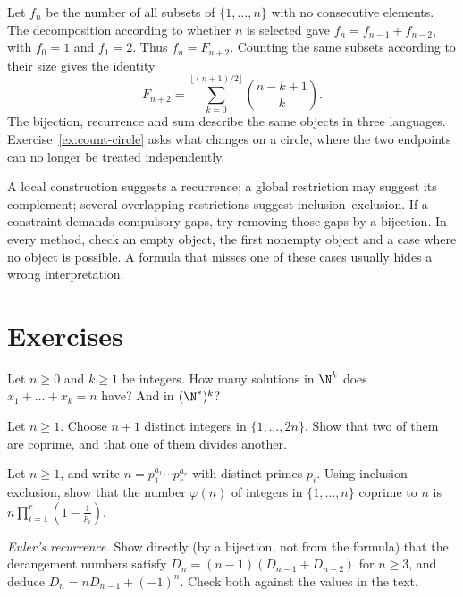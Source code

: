 Let $f_n$ be the number of all subsets of $\{1,\dots,n\}$ with no consecutive elements. The decomposition according to whether $n$ is selected gave $f_n=f_{n-1}+f_{n-2}$, with $f_0=1$ and $f_1=2$. Thus $f_n=F_{n+2}$. Counting the same subsets according to their size gives the identity
\[
F_{n+2}=\sum_{k=0}^{\lfloor(n+1)/2\rfloor}\binom{n-k+1}{k}.
\]
The bijection, recurrence and sum describe the same objects in three languages. Exercise~\ref{ex:count-circle} asks what changes on a circle, where the two endpoints can no longer be treated independently.

\begin{reminder}
A local construction suggests a recurrence; a global restriction may suggest its complement; several overlapping restrictions suggest inclusion--exclusion. If a constraint demands compulsory gaps, try removing those gaps by a bijection. In every method, check an empty object, the first nonempty object and a case where no object is possible. A formula that misses one of these cases usually hides a wrong interpretation.
\end{reminder}

\section{Exercises}
\begin{exercise}[$\star$]\label{ex:stars}
Let $n\ge0$ and $k\ge1$ be integers. How many solutions in $\N^k$ does $x_1+\dots+x_k=n$ have? And in $(\N^*)^k$?
\end{exercise}

\begin{exercise}[$\star\star$]\label{ex:pigeon}
Let $n\ge1$. Choose $n+1$ distinct integers in $\{1,\dots,2n\}$. Show that two of them are coprime, and that one of them divides another.
\end{exercise}

\begin{exercise}[$\star\star$]\label{ex:phi}
Let $n\ge1$, and write $n=p_1^{a_1}\cdots p_r^{a_r}$ with distinct primes $p_i$. Using inclusion--exclusion, show that the number $\varphi(n)$ of integers in $\{1,\dots,n\}$ coprime to $n$ is
$n\prod_{i=1}^r\left(1-\frac1{p_i}\right)$.
\end{exercise}

\begin{exercise}[$\star\star$]\label{ex:derangrec}
\emph{Euler's recurrence.} Show directly (by a bijection, not from the formula) that the derangement numbers satisfy $D_n=(n-1)(D_{n-1}+D_{n-2})$ for $n\ge3$, and deduce $D_n=nD_{n-1}+(-1)^n$. Check both against the values in the text.
\end{exercise}

